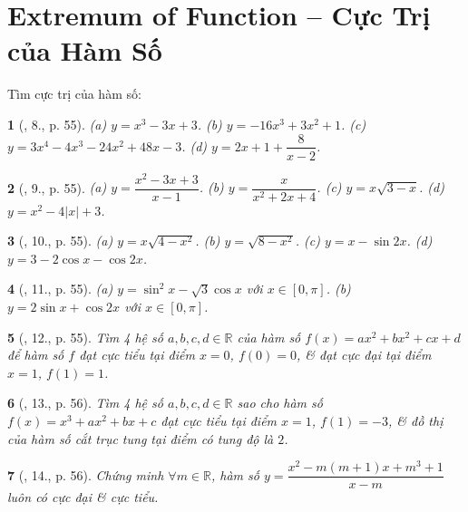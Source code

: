 \documentclass{article}
\newtheorem{baitoan}{}
\begin{document}

\section{Extremum of Function -- Cực Trị của Hàm Số}
Tìm cực trị của hàm số:

\begin{baitoan}[\cite{TLCT_BT_dai_so_giai_tich_11}, 8., p. 55]
	(a) $y = x^3 - 3x + 3$. (b) $y = -16x^3 + 3x^2 + 1$. (c) $y = 3x^4 - 4x^3 - 24x^2 + 48x - 3$. (d) $y = 2x + 1 + \dfrac{8}{x - 2}$.
\end{baitoan}

\begin{baitoan}[\cite{TLCT_BT_dai_so_giai_tich_11}, 9., p. 55]
	(a) $y = \dfrac{x^2 - 3x + 3}{x - 1}$. (b) $y = \dfrac{x}{x^2 + 2x + 4}$. (c) $y = x\sqrt{3 - x}$. (d) $y = x^2 - 4|x| + 3$.
\end{baitoan}

\begin{baitoan}[\cite{TLCT_BT_dai_so_giai_tich_11}, 10., p. 55]
	(a) $y = x\sqrt{4 - x^2}$. (b) $y = \sqrt{8 - x^2}$. (c) $y = x - \sin2x$. (d) $y = 3 - 2\cos x - \cos2x$.
\end{baitoan}

\begin{baitoan}[\cite{TLCT_BT_dai_so_giai_tich_11}, 11., p. 55]
	(a) $y = \sin^2x - \sqrt{3}\cos x$ với $x\in[0,\pi]$. (b) $y = 2\sin x + \cos2x$ với $x\in[0,\pi]$.
\end{baitoan}

\begin{baitoan}[\cite{TLCT_BT_dai_so_giai_tich_11}, 12., p. 55]
	Tìm 4 hệ số $a,b,c,d\in\mathbb{R}$ của hàm số $f(x) = ax^2 + bx^2 + cx + d$ để hàm số $f$ đạt cực tiểu tại điểm $x = 0$, $f(0) = 0$, \& đạt cực đại tại điểm $x = 1$, $f(1) = 1$.
\end{baitoan}

\begin{baitoan}[\cite{TLCT_BT_dai_so_giai_tich_11}, 13., p. 56]
	Tìm 4 hệ số $a,b,c,d\in\mathbb{R}$ sao cho hàm số $f(x) = x^3 + ax^2 + bx + c$ đạt cực tiểu tại điểm $x = 1$, $f(1) = -3$, \& đồ thị của hàm số cắt trục tung tại điểm có tung độ là $2$.
\end{baitoan}

\begin{baitoan}[\cite{TLCT_BT_dai_so_giai_tich_11}, 14., p. 56]
	Chứng minh $\forall m\in\mathbb{R}$, hàm số $y = \dfrac{x^2 - m(m + 1)x + m^3 + 1}{x - m}$ luôn có cực đại \& cực tiểu.
\end{baitoan}
\end{document}
